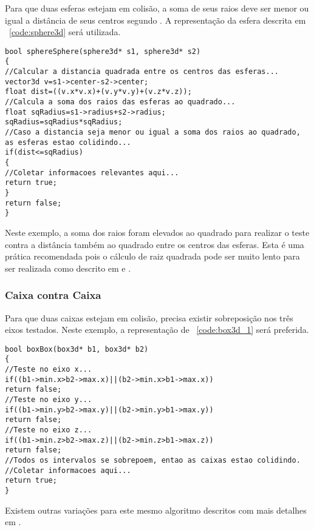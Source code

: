 Para que duas esferas estejam em colisão, a soma de seus raios deve ser menor
ou igual a distância de seus centros segundo .
A representação da esfera descrita em ~\ref{code:sphere3d} será utilizada.

\begin{lstlisting}[frame=single,caption=Colisão entre esferas\label{code:collisionSphereSphere}]
bool sphereSphere(sphere3d* s1, sphere3d* s2)
{
//Calcular a distancia quadrada entre os centros das esferas...
vector3d v=s1->center-s2->center;
float dist=((v.x*v.x)+(v.y*v.y)+(v.z*v.z));
//Calcula a soma dos raios das esferas ao quadrado...
float sqRadius=s1->radius+s2->radius;
sqRadius=sqRadius*sqRadius;
//Caso a distancia seja menor ou igual a soma dos raios ao quadrado, as esferas estao colidindo...
if(dist<=sqRadius)
{
//Coletar informacoes relevantes aqui...
return true;
}
return false;
}
\end{lstlisting}

Neste exemplo, a soma dos raios foram elevados ao quadrado para realizar o
teste contra a distância também ao quadrado entre os centros das esferas.
Esta é uma prática recomendada pois o cálculo de raiz quadrada pode ser muito
lento para ser realizada como descrito em  e .

\subsubsection{Caixa contra Caixa}

Para que duas caixas estejam em colisão, precisa existir sobreposição nos três
eixos testados.
Neste exemplo, a representação de ~\ref{code:box3d_1} será preferida.

\begin{lstlisting}[frame=single,caption=Colisão entre caixas\label{code:collisionBoxBox}]
bool boxBox(box3d* b1, box3d* b2)
{
//Teste no eixo x...
if((b1->min.x>b2->max.x)||(b2->min.x>b1->max.x))
return false;
//Teste no eixo y...
if((b1->min.y>b2->max.y)||(b2->min.y>b1->max.y))
return false;
//Teste no eixo z...
if((b1->min.z>b2->max.z)||(b2->min.z>b1->max.z))
return false;
//Todos os intervalos se sobrepoem, entao as caixas estao colidindo.
//Coletar informacoes aqui...
return true;
}
\end{lstlisting}

Existem outras variações para este mesmo algoritmo descritos com mais detalhes
em .


